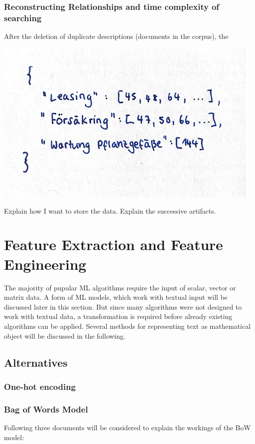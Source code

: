 		\subsubsection{Reconstructing Relationships and time complexity of searching}
		After the deletion of duplicate descriptions (documents in the corpus), the 
		
		\includegraphics[height=8cm]{Bilder/description_map.png}

Explain how I want to store the data. Explain the successive artifacts.

        
        \section{Feature Extraction and Feature Engineering}
        The majority of pupular ML algorithms require the input of scalar, vector or matrix data. A form of ML models, which work with textual input will be discussed later in this section. 
        But since many algorithms were not designed to work with textual data, a transformation is required before already existing algorithms can be applied. Several methods for representing text as mathematical object will be discussed in the following.
    
            \subsection{Alternatives}
            \subsubsection{One-hot encoding}
            
    
            \subsubsection{Bag of Words Model}
            Following three documents will be considered to explain the workings of the \ac{BoW} model:
    
